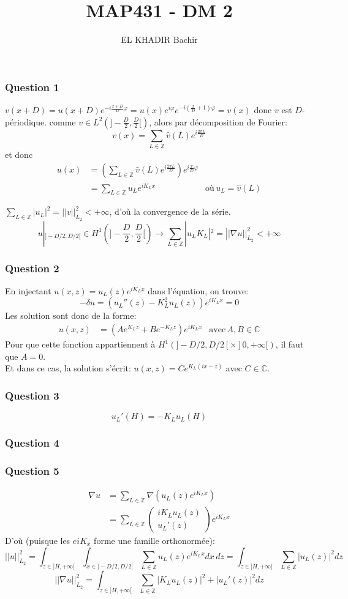 \documentclass{article}
\newcommand{\Q}[1]{\subsubsection*{Question #1}}
\begin{document}
\title{MAP431 - DM 2}
\author{EL KHADIR Bachir}



\Q{1}

$v(x+D) = u(x+D) e^{-i\frac{x+D}{D} \varphi} = u(x)e^{i \varphi} e^{-i(\frac{x}{D}+1) \varphi} = v(x)$ donc $v$ est $D$-périodique.
comme $v \in L^2( ] -\frac{D}{2},\frac{D}{2} [) $, alors par décomposition de Fourier:
$$v(x) = \sum_{L \in \mathbb{Z}} \hat v(L) e^{i \frac{2\pi L}{D} }$$
et donc
\begin{align*}
u(x) &= \left( \sum_{L \in \mathbb{Z}} \hat v(L) e^{i \frac{2\pi L}{D} } \right) e^{i\frac{x}{D}\varphi} \\
&= \sum_{L \in \mathbb{Z}} u_L e^{i K_L x} & \text{où} \, u_L = \hat v(L)
\end{align*}

$\sum_{L \in \mathbb{Z}} |u_L| ^2 = || v ||_{L_2}^2 < + \infty$, d'où la convergence de la série.
$$u|_{]-D/2,D/2[} \in H^1(]-\frac{D}{2}, \frac{D}{2}[) \rightarrow \sum_{L \in \mathbb{Z}} |u_L K_L|^2 = || \nabla u ||_{L_2}^2 < +\infty$$


\Q{2}
En injectant $u(x, z) = u_L(z) e^{i K_L x}$ dans l'équation, on trouve:
$$ -\delta u = (u_L''(z) - K_L^2 u_L(z)) e^{iK_L x} = 0$$
Les solution sont donc de la forme:
\begin{align*}
u(x, z) &= (A e^{K_L z} + B e^{-K_L z}) e^{i K_L x} & \text{avec} \, A, B \in \mathbb{C}
\end{align*}
Pour que cette fonction appartiennent à $H^1(]-D/2, D/2[ \times ]0, +\infty[ )$, il faut que $A = 0$.\\
Et dans ce cas, la solution s'écrit: $u(x, z) =   C e^{K_L (i x - z) }$ avec $C \in \mathbb{C}$.

\Q{3}
$$u_L'(H) = -K_L u_L(H)$$

\Q{4}

\Q{5}

\begin{align*}
\nabla u &= \sum_{L\in\mathbb{Z}} \nabla (u_L(z)e^{iK_Lx})  \\
&= \sum_{L\in\mathbb{Z}} \begin{pmatrix} i K_L u_L(z) \\ u_L'(z) \end{pmatrix} e^{iK_Lx}
\end{align*}
D'où (puisque les $e{iK_x}$ forme une famille orthonormée):
$$ ||u||_{L_2}^2 = \int_{z \in ]H, + \infty[} \int_{x \in ]-D/2, D/2[} \sum_{L\in\mathbb{Z}} u_L(z)e^{iK_Lx} dx \, dz 
= \int_{z \in ]H, + \infty[} \sum_{L\in\mathbb{Z}} |u_L(z)|^2 dz$$
$$ ||\nabla u||_{L_2}^2 
= \int_{z \in ]H, + \infty[} \sum_{L\in\mathbb{Z}} |K_L u_L(z) |^2 + |u_L'(z)|^2 dz$$
\end{document}
